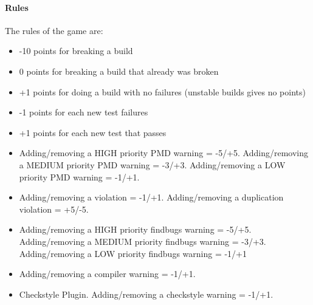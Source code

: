 \documentclass[a4paper,twoside]{article}      %
\begin{document}
\paragraph{Rules}
The rules of the game are:
\begin{itemize}
\item -10 points for breaking a build
\item 0 points for breaking a build that already was broken
\item +1 points for doing a build with no failures (unstable builds gives no points)
\item -1 points for each new test failures
\item +1 points for each new test that passes
\item Adding/removing a HIGH priority PMD warning = -5/+5. Adding/removing a MEDIUM priority PMD warning = -3/+3. Adding/removing a LOW priority PMD warning = -1/+1.
\item Adding/removing a violation = -1/+1. Adding/removing a duplication violation = +5/-5.
\item Adding/removing a HIGH priority findbugs warning = -5/+5. Adding/removing a MEDIUM priority findbugs warning = -3/+3. Adding/removing a LOW priority findbugs warning = -1/+1
\item Adding/removing a compiler warning = -1/+1.
\item Checkstyle Plugin. Adding/removing a checkstyle warning = -1/+1.
\end{itemize}
\end{document}
